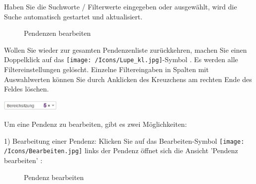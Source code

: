 
Haben Sie die Suchworte / Filterwerte eingegeben oder ausgewählt, wird die Suche automatisch gestartet und aktualisiert. 

\begin{figure}[H]
\caption{Pendenzen bearbeiten}
\end{figure}

Wollen Sie wieder zur gesamten Pendenzenliste zurückkehren, machen Sie einen Doppelklick auf das \texttt{[image: /Icons/Lupe\_kl.jpg]}-Symbol . Es werden alle Filtereinstellungen gelöscht. Einzelne Filtereingaben in Spalten mit Auswahlwerten können Sie durch Anklicken des Kreuzchens  am rechten Ende des Feldes löschen. 

\begin{center}
\includegraphics[height=14pt]{../chapters/05_Sitzungswesen/pictures/5-5_PendenzenFeldLoeschen.jpg}
\end{center}

Um eine Pendenz zu bearbeiten, gibt es zwei Möglichkeiten: 

\vspace{\baselineskip}

1) Bearbeitung einer Pendenz: Klicken Sie auf das Bearbeiten-Symbol \texttt{[image: /Icons/Bearbeiten.jpg]}  links der Pendenz öffnet sich die Ansicht 'Pendenz bearbeiten' :

\begin{figure}[H]
\caption{Pendenz bearbeiten}
\end{figure}

